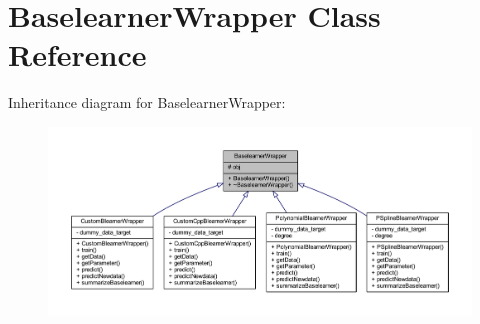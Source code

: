 \hypertarget{class_baselearner_wrapper}{}\section{Baselearner\+Wrapper Class Reference}
\label{class_baselearner_wrapper}


Inheritance diagram for Baselearner\+Wrapper\+:
\nopagebreak
\begin{figure}[H]
\begin{center}
\leavevmode
\includegraphics[width=350pt]{class_baselearner_wrapper__inherit__graph}
\end{center}
\end{figure}



